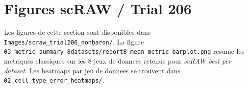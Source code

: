 \section*{Figures scRAW / Trial 206}

Les figures de cette section sont disponibles dans \texttt{Images/scraw_trial206_nonbaron/}.
La figure \texttt{03_metric_summary_8datasets/report8_mean_metric_barplot.png} resume les metriques classiques sur les 8 jeux de donnees retenus pour \textit{scRAW best per dataset}.
Les heatmaps par jeu de donnees se trouvent dans \texttt{02_cell_type_error_heatmaps/}.

